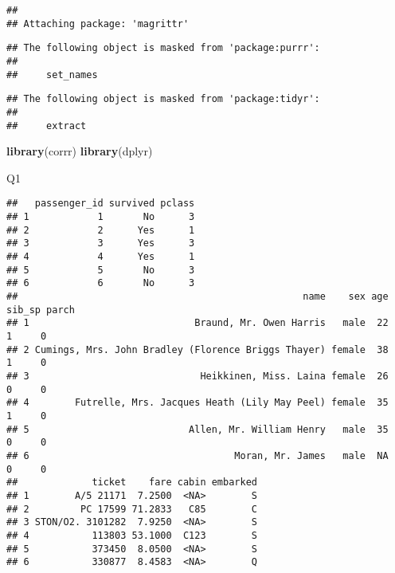 \documentclass[]{article}
\newenvironment{Shaded}{\begin{snugshade}}{\end{snugshade}}
\newcommand{\DataTypeTok}[1]{\textcolor[rgb]{0.13,0.29,0.53}{#1}}
\newcommand{\KeywordTok}[1]{\textcolor[rgb]{0.13,0.29,0.53}{\textbf{#1}}}
\newcommand{\NormalTok}[1]{#1}
\newcommand{\OperatorTok}[1]{\textcolor[rgb]{0.81,0.36,0.00}{\textbf{#1}}}
\newcommand{\StringTok}[1]{\textcolor[rgb]{0.31,0.60,0.02}{#1}}
\begin{document}
\begin{verbatim}
## 
## Attaching package: 'magrittr'
\end{verbatim}

\begin{verbatim}
## The following object is masked from 'package:purrr':
## 
##     set_names
\end{verbatim}

\begin{verbatim}
## The following object is masked from 'package:tidyr':
## 
##     extract
\end{verbatim}

\begin{Shaded}
\begin{Highlighting}[]
\KeywordTok{library}\NormalTok{(corrr)}
\KeywordTok{library}\NormalTok{(dplyr)}
\end{Highlighting}
\end{Shaded}

Q1

\begin{Shaded}
\end{Shaded}

\begin{verbatim}
##   passenger_id survived pclass
## 1            1       No      3
## 2            2      Yes      1
## 3            3      Yes      3
## 4            4      Yes      1
## 5            5       No      3
## 6            6       No      3
##                                                  name    sex age sib_sp parch
## 1                             Braund, Mr. Owen Harris   male  22      1     0
## 2 Cumings, Mrs. John Bradley (Florence Briggs Thayer) female  38      1     0
## 3                              Heikkinen, Miss. Laina female  26      0     0
## 4        Futrelle, Mrs. Jacques Heath (Lily May Peel) female  35      1     0
## 5                            Allen, Mr. William Henry   male  35      0     0
## 6                                    Moran, Mr. James   male  NA      0     0
##             ticket    fare cabin embarked
## 1        A/5 21171  7.2500  <NA>        S
## 2         PC 17599 71.2833   C85        C
## 3 STON/O2. 3101282  7.9250  <NA>        S
## 4           113803 53.1000  C123        S
## 5           373450  8.0500  <NA>        S
## 6           330877  8.4583  <NA>        Q
\end{verbatim}
\end{document}
